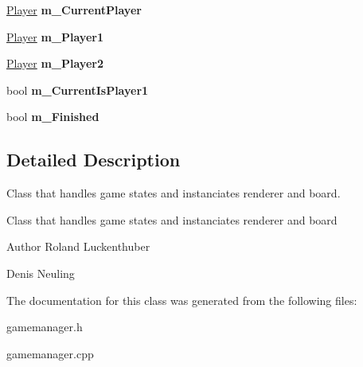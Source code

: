 \begin{DoxyCompactItemize}
\item 
\hypertarget{classGameManager_a266242aba3c8f5a98b79bd48bf257a5d}{\hyperlink{classPlayer}{\-Player} {\bfseries m\-\_\-\-Current\-Player}}\label{classGameManager_a266242aba3c8f5a98b79bd48bf257a5d}

\item 
\hypertarget{classGameManager_a354706b4266f9720a284402a2c22b060}{\hyperlink{classPlayer}{\-Player} {\bfseries m\-\_\-\-Player1}}\label{classGameManager_a354706b4266f9720a284402a2c22b060}

\item 
\hypertarget{classGameManager_a53dc81fe5edc0284d9e15557494d5f17}{\hyperlink{classPlayer}{\-Player} {\bfseries m\-\_\-\-Player2}}\label{classGameManager_a53dc81fe5edc0284d9e15557494d5f17}

\item 
\hypertarget{classGameManager_aa352a1a6b760aefdc1c21065eb5e1c5b}{bool {\bfseries m\-\_\-\-Current\-Is\-Player1}}\label{classGameManager_aa352a1a6b760aefdc1c21065eb5e1c5b}

\item 
\hypertarget{classGameManager_a4357ddc5393953e39d5b217103e85f63}{bool {\bfseries m\-\_\-\-Finished}}\label{classGameManager_a4357ddc5393953e39d5b217103e85f63}

\end{DoxyCompactItemize}


\subsection{\-Detailed \-Description}
\-Class that handles game states and instanciates renderer and board. 

\-Class that handles game states and instanciates renderer and board

\begin{DoxyAuthor}{\-Author}
\-Roland \-Luckenthuber 

\-Denis \-Neuling 
\end{DoxyAuthor}


\-The documentation for this class was generated from the following files\-:\begin{DoxyCompactItemize}
\item 
gamemanager.\-h\item 
gamemanager.\-cpp\end{DoxyCompactItemize}
